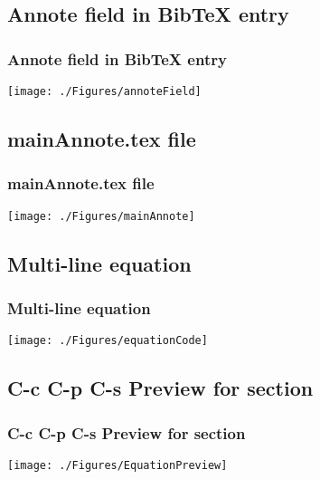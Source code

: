 \documentclass{beamer}
\begin{document}
\subsection{Annote field in BibTeX entry}
\begin{frame}
\frametitle{Annote field in BibTeX entry}
\begin{center}
\begin{center}
    \texttt{[image: ./Figures/annoteField]}
\end{center}
\end{center}
\end{frame}
\note{  }


\subsection{mainAnnote.tex file}
\begin{frame}
\frametitle{mainAnnote.tex file}
\begin{center}
\begin{center}
    \texttt{[image: ./Figures/mainAnnote]}
\end{center}
\end{center}
\end{frame}
\note{  }


\subsection{Multi-line equation}
\begin{frame}
\frametitle{Multi-line equation}
\begin{center}
\begin{center}
    \texttt{[image: ./Figures/equationCode]}
\end{center}
\end{center}
\end{frame}
\note{}




\subsection{C-c C-p C-s Preview for section}
\begin{frame}
\frametitle{C-c C-p C-s Preview for section}
\begin{center}
\begin{center}
    \texttt{[image: ./Figures/EquationPreview]}
\end{center}
\end{center}
\end{frame}
\note{}
\end{document}
